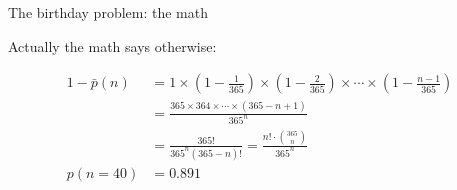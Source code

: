 \documentclass[ignorenonframetext,]{beamer}
\begin{document}
\begin{frame}{The birthday problem: the math}

Actually the math says otherwise:

\begin{align} 
 1 - \bar p(n) &= 1 \times \left(1-\frac{1}{365}\right) \times \left(1-\frac{2}{365}\right) \times \cdots \times \left(1-\frac{n-1}{365}\right) \nonumber  \\  &= \frac{ 365 \times 364 \times \cdots \times (365-n+1) }{ 365^n } \nonumber \\ &= \frac{ 365! }{ 365^n (365-n)!} = \frac{n!\cdot\binom{365}{n}}{365^n}\\
p(n= 40) &= 0.891  \nonumber
\end{align}

\end{frame}
\end{document}
